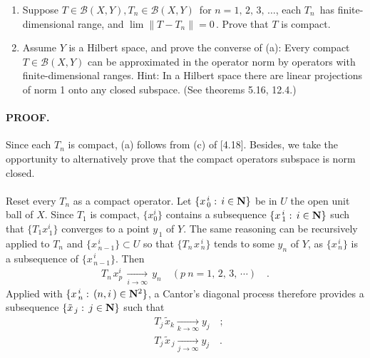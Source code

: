 { \CMUCS 
\begin{enumerate}
\renewcommand{\labelenumi}{(\alph{enumi})}
\item Suppose $T\in \mathscr{B}(X,Y), T_n \in  \mathscr{B}(X,Y)\, $ for $n=1,\, 2, \, 3,\, \dots$, each $T_n\,$ has finite-dimensional range, and $\lim \| T-T_n\|=0\, $. Prove that $T$ is compact.
\item Assume $Y$ is a Hilbert space, and prove the converse of (a): Every compact $T\in  \mathscr{B}(X,Y)$ can be approximated in the operator norm by operators with finite-dimensional ranges. Hint: In a Hilbert space there are linear projections of norm 1 onto any closed subspace. (See theorems 5.16, 12.4.)
\end{enumerate}
}
\paragraph{PROOF.} Since each $T_n$ is compact, (a) follows from (c) of [4.18]. Besides, we take the opportunity to alternatively prove that the compact operators subspace is norm closed.\\
\\
Reset every $T_n$ as a compact operator. Let $\{x_{\,0}^{\,i}:\, i\in {\mathbf N}\}$ be in $U$ the open unit ball of $X$. Since $T_1$ is compact, $\{x^i_0\}$ contains a subsequence $\{x^{\,i}_{\,1}:\, i\in {\mathbf N}\}$ such that $\{T_1x^{i}_{\,1}\}$ converges to a point $y_{\,1}$ of $Y$. The same reasoning can be recursively applied to $T_{n}$ and $\{x^{\,i}_{\, n-1}\}\subset U$ so that $\{T_{n\,}x^{\,i}_{\, n}\}$ tends to some $y_{n}$ of $Y$, as $\{x^{\,i}_{\, n}\}$ is a subsequence of $\{x^{\,i}_{\,n-1}\}$. Then
\begin{align}\label{4_13_a_0}
T_{n\,} x^{i}_p \,\underset{i\to \infty}{\longrightarrow}\,y_n\quad (p\> n=1,\, 2,\, 3,\, \dotsb )\quad .
\end{align}
Applied with $\{x^{\,i}_{\,n}:\, (n,i\,)\in{\mathbf N}^2\}$, a Cantor's diagonal process therefore provides a subsequence $\{\tilde{x}_{\, j}:\, j\in {\mathbf N}\} $ such that
\begin{align}\label{4_13_a_1}
&T_{j\,} \tilde{x}_k \underset{k\to \infty}{\longrightarrow}y_{j}\quad ;\\
&T_{j\,} \tilde{x}_{\, j} \underset{j\to \infty}{\longrightarrow} y_{j}\quad .
\end{align}
